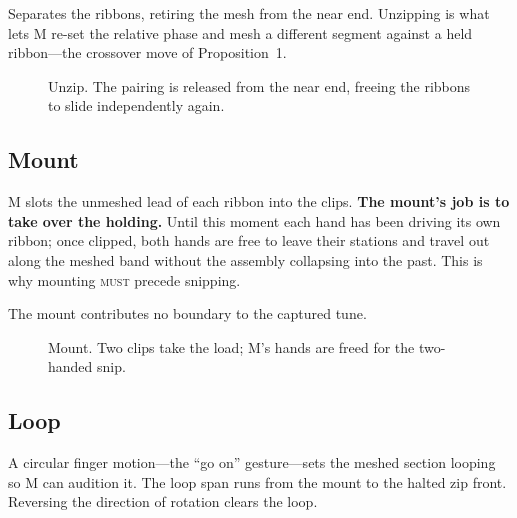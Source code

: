 \documentclass[11pt,a4paper]{article}
\newcommand{\MUST}{\textsc{must}}
\theoremstyle{definition}
\theoremstyle{plain}
\theoremstyle{remark}
\newcommand{\spools}{%
  \fill[ribL,opacity=.45,rounded corners=2pt] (1.55,5.40) rectangle (2.45,5.95);
  \fill[ribR,opacity=.45,rounded corners=2pt] (5.55,5.40) rectangle (6.45,5.95);
  \node[font=\scriptsize] at (2,6.22) {left spool};
  \node[font=\scriptsize] at (6,6.22) {right spool};
}
\newcommand{\musician}{%
  \draw[gray] (4,-0.10) circle (0.23);
  \node[font=\scriptsize] at (4,-0.10) {M};
}
\newcommand{\axes}{%
  \draw[->,gray,thin] (0.85,4.30) -- (1.45,4.30) node[right,font=\scriptsize]{$x$};
  \draw[->,gray,thin] (0.85,4.30) -- (0.85,4.90) node[above,font=\scriptsize]{$z$};
}
\newcommand{\ribbonszipped}{%
  \draw[ribL,opacity=.45,line width=16pt,line join=round]
    (2,5.40) -- (2,4.60) -- (3.72,4.20) -- (3.72,2.20) -- (3.10,1.70) -- (3.10,0.70);
  \draw[ribR,opacity=.45,line width=16pt,line join=round]
    (6,5.40) -- (6,4.60) -- (4.28,4.20) -- (4.28,2.20) -- (4.90,1.70) -- (4.90,0.70);
}
\newcommand{\mesh}[2]{%
  \draw[gray!75,decorate,decoration={zigzag,segment length=5pt,amplitude=3pt}]
    (4,#1) -- (4,#2);
}
\newcommand{\mountclips}{%
  \fill[amb,opacity=.75,rounded corners=1pt] (3.76,1.05) rectangle (3.92,1.45);
  \fill[amb,opacity=.75,rounded corners=1pt] (4.08,1.05) rectangle (4.24,1.45);
}
\newcommand{\handat}[2]{\filldraw[fill=white,draw=gray!80,thin] (#1,#2) circle (0.17);}
\newcommand{\handsdefault}{\handat{3.10}{0.55}\handat{4.90}{0.55}}
\begin{document}
Separates the ribbons, retiring the mesh from the near end. Unzipping is what lets M re-set the
relative phase and mesh a different segment against a held ribbon---the crossover move of
Proposition~1.

\begin{figure}[H]\centering
{}
\caption{Unzip. The pairing is released from the near end, freeing the ribbons to slide
independently again.}
\end{figure}

\subsection{Mount}

M slots the unmeshed lead of each ribbon into the clips. \textbf{The mount's job is to take over the
holding.} Until this moment each hand has been driving its own ribbon; once clipped, both hands are
free to leave their stations and travel out along the meshed band without the assembly collapsing
into the past. This is why mounting \MUST{} precede snipping.

The mount contributes no boundary to the captured tune.

\begin{figure}[H]\centering
{}
\caption{Mount. Two clips take the load; M's hands are freed for the two-handed snip.}
\end{figure}

\subsection{Loop}

A circular finger motion---the ``go on'' gesture---sets the meshed section looping so M can audition
it. The loop span runs from the mount to the halted zip front. Reversing the direction of rotation
clears the loop.
\end{document}
